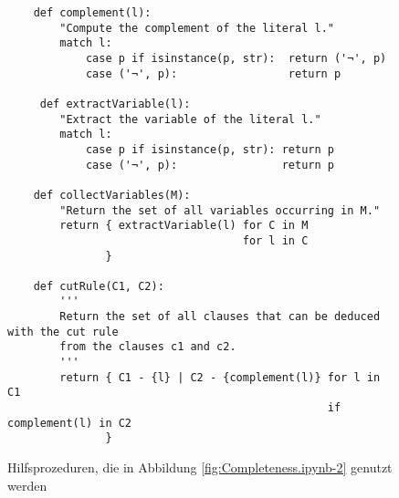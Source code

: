 \begin{figure}[!ht]
\centering
\begin{verbatim}
    def complement(l):
        "Compute the complement of the literal l."
        match l:
            case p if isinstance(p, str):  return ('¬', p)
            case ('¬', p):                 return p

     def extractVariable(l):
        "Extract the variable of the literal l."
        match l:
            case p if isinstance(p, str): return p           
            case ('¬', p):                return p
    
    def collectVariables(M):
        "Return the set of all variables occurring in M."
        return { extractVariable(l) for C in M 
                                    for l in C
               }        
        
    def cutRule(C1, C2):
        '''
        Return the set of all clauses that can be deduced with the cut rule 
        from the clauses c1 and c2.
        '''
        return { C1 - {l} | C2 - {complement(l)} for l in C1
                                                 if  complement(l) in C2
               }
\end{verbatim}
\vspace*{-0.3cm}
\caption{Hilfsprozeduren, die in Abbildung \ref{fig:Completeness.ipynb-2} genutzt werden}
\label{fig:Completeness.ipynb-1}
\end{figure}

